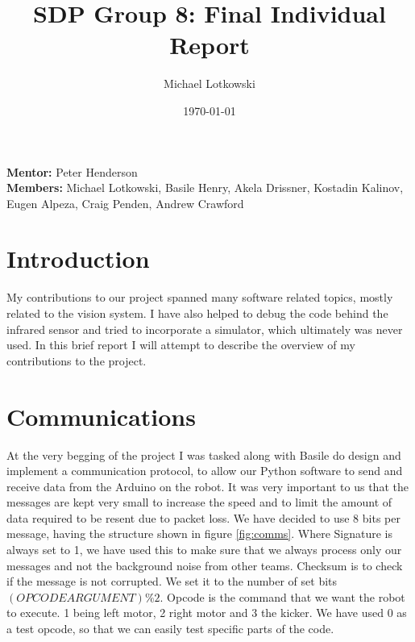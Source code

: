 \documentclass[a4paper,12pt]{article}
\title{SDP Group 8: Final Individual Report} %
\author{Michael Lotkowski} %
\date{\today}
\begin{document}
\maketitle %

\begin{center}
\textbf{Mentor:} Peter Henderson
\\
\textbf{Members:} Michael Lotkowski, %
Basile Henry,
Akela Drissner,
Kostadin Kalinov,
Eugen Alpeza,
Craig Penden,
Andrew Crawford

\end{center}


\section{Introduction}

My contributions to our project spanned many software related topics, mostly related to the vision system. I have also helped to debug the code behind the infrared sensor and tried to incorporate a simulator, which ultimately was never used. In this brief report I will attempt to describe the overview of my contributions to the project.


\section{Communications}

At the very begging of the project I was tasked along with Basile do design and implement a communication protocol, to allow our Python software to send and receive data from the Arduino on the robot. It was very important to us that the messages are kept very small to increase the speed and to limit the amount of data required to be resent due to packet loss. We have decided to use 8 bits per message, having the structure shown in figure \ref{fig:comms}. Where Signature is always set to 1, we have used this to make sure that we always process only our messages and not the background noise from other teams. Checksum is to check if the message is not corrupted. We set it to the number of set bits $(OPCODE ARGUMENT) \% 2$. Opcode is the command that we want the robot to execute. 1 being left motor, 2 right motor and 3 the kicker. We have used 0 as a test opcode, so that we can easily test specific parts of the code. 
\end{document}
